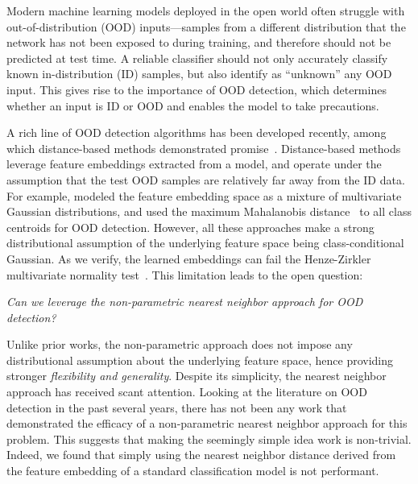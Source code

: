 \documentclass[nohyperref]{article}
\theoremstyle{plain}
\theoremstyle{definition}
\theoremstyle{remark}
\begin{document}
Modern machine learning models deployed in the open world often struggle with out-of-distribution (OOD) inputs---samples from a different distribution that the network has not been exposed to during training, and therefore should not be predicted at test time. A reliable classifier should not only accurately classify known in-distribution (ID) samples, but also identify as ``unknown'' any OOD input. This gives rise to the importance of OOD detection, which determines whether an input is ID or OOD and enables the
model to take precautions.

A rich line of OOD detection algorithms has been developed recently, among which distance-based methods demonstrated promise~\citep{lee2018simple, tack2020csi, 2021ssd}. Distance-based methods leverage feature embeddings extracted from a model, and operate under the assumption that the test OOD samples are relatively far away from the ID data. For example, \citeauthor{lee2018simple} modeled the feature embedding space as a mixture of multivariate Gaussian distributions, and used the maximum Mahalanobis distance~\citep{mahalanobis1936generalized} to all class centroids for OOD detection. 
However, all these approaches make a strong distributional assumption of the underlying feature space being class-conditional Gaussian. 
As we verify, the learned embeddings can fail the Henze-Zirkler multivariate normality test~\citep{henze1990class}. This limitation leads to the open question:

\begin{center}
\emph{Can we leverage the non-parametric nearest neighbor approach for OOD detection?}
\end{center}

Unlike prior works, the non-parametric approach does not impose {any} distributional assumption about the underlying feature space, hence providing stronger \emph{flexibility and generality}. Despite its simplicity, the nearest neighbor approach has received scant attention. Looking at the literature on OOD detection in the past several years, there has not been any work that demonstrated the efficacy of a non-parametric nearest neighbor approach for this problem. {This suggests that making the seemingly simple idea work is non-trivial}. Indeed, we found that simply using the nearest neighbor distance derived from the feature embedding of a standard classification model is not performant. 
\end{document}
